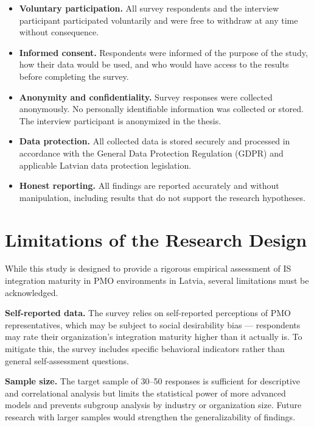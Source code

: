 \begin{itemize}
    \item \textbf{Voluntary participation.} All survey respondents and
    the interview participant participated voluntarily and were free to
    withdraw at any time without consequence.
    \item \textbf{Informed consent.} Respondents were informed of the
    purpose of the study, how their data would be used, and who would
    have access to the results before completing the survey.
    \item \textbf{Anonymity and confidentiality.} Survey responses were
    collected anonymously. No personally identifiable information was
    collected or stored. The interview participant is anonymized in the
    thesis.
    \item \textbf{Data protection.} All collected data is stored securely
    and processed in accordance with the General Data Protection Regulation
    (GDPR) and applicable Latvian data protection legislation.
    \item \textbf{Honest reporting.} All findings are reported accurately
    and without manipulation, including results that do not support the
    research hypotheses.
\end{itemize}

\section{Limitations of the Research Design}
\label{sec:limitations}

While this study is designed to provide a rigorous empirical assessment of
IS integration maturity in PMO environments in Latvia, several limitations
must be acknowledged.

\textbf{Self-reported data.} The survey relies on self-reported perceptions
of PMO representatives, which may be subject to social desirability bias ---
respondents may rate their organization's integration maturity higher than
it actually is. To mitigate this, the survey includes specific behavioral
indicators rather than general self-assessment questions.

\textbf{Sample size.} The target sample of 30--50 responses is sufficient
for descriptive and correlational analysis but limits the statistical power
of more advanced models and prevents subgroup analysis by industry or
organization size. Future research with larger samples would strengthen
the generalizability of findings.

